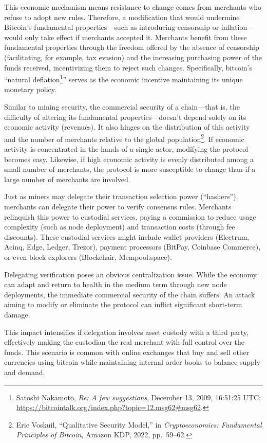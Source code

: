 \documentclass[
  a5paper,
  smalldemyvopaper,10pt,twoside,onecolumn,openright,extrafontsizes,hidelinks]{memoir}
\begin{document}
This economic mechanism means resistance to change comes from merchants
who refuse to adopt new rules. Therefore, a modification that would
undermine Bitcoin's fundamental properties---such as introducing
censorship or inflation---would only take effect if merchants accepted
it. Merchants benefit from these fundamental properties through the
freedom offered by the absence of censorship (facilitating, for example,
tax evasion) and the increasing purchasing power of the funds received,
incentivizing them to reject such changes. Specifically, bitcoin's
``natural deflation\footnote{Satoshi Nakamoto, \emph{Re: A few
  suggestions}, December 13, 2009, 16:51:25 UTC:
  \url{https://bitcointalk.org/index.php?topic=12.msg62\#msg62}.}''
serves as the economic incentive maintaining its unique monetary policy.

Similar to mining security, the commercial security of a chain---that
is, the difficulty of altering its fundamental properties---doesn't
depend solely on its economic activity (revenues). It also hinges on the
distribution of this activity and the number of merchants relative to
the global population\footnote{Eric Voskuil, ``Qualitative Security
  Model,'' in \emph{Cryptoeconomics: Fundamental Principles of Bitcoin},
  Amazon KDP, 2022, pp.~59--62.}. If economic activity is concentrated
in the hands of a single actor, modifying the protocol becomes easy.
Likewise, if high economic activity is evenly distributed among a small
number of merchants, the protocol is more susceptible to change than if
a large number of merchants are involved.

Just as miners may delegate their transaction selection power
(``hashers''), merchants can delegate their power to verify consensus
rules. Merchants relinquish this power to custodial services, paying a
commission to reduce usage complexity (such as node deployment) and
transaction costs (through fee discounts). These custodial services
might include wallet providers (Electrum, Acinq, Edge, Ledger, Trezor),
payment processors (BitPay, Coinbase Commerce), or even block explorers
(Blockchair, Mempool.space).

Delegating verification poses an obvious centralization issue. While the
economy can adapt and return to health in the medium term through new
node deployments, the immediate commercial security of the chain
suffers. An attack aiming to modify or eliminate the protocol can
inflict significant short-term damage.

This impact intensifies if delegation involves asset custody with a
third party, effectively making the custodian the real merchant with
full control over the funds. This scenario is common with online
exchanges that buy and sell other currencies using bitcoin while
maintaining internal order books to balance supply and demand.
\end{document}
